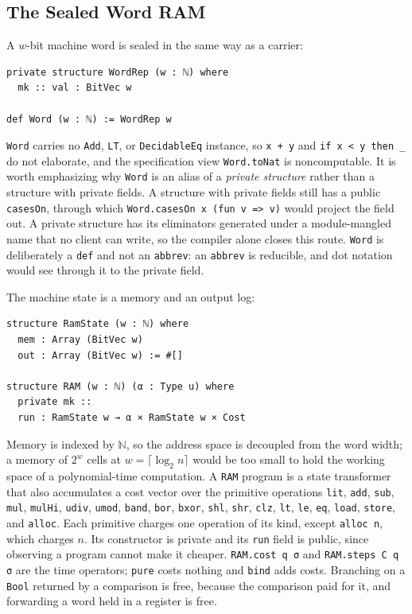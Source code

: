 \documentclass[acmsmall,nonacm]{acmart}
\begin{document}
\subsection{The Sealed Word RAM}\label{sec:ram}

A $w$-bit machine word is sealed in the same way as a carrier:

\begin{lstlisting}
private structure WordRep (w : ℕ) where
  mk :: val : BitVec w

def Word (w : ℕ) := WordRep w
\end{lstlisting}

\lstinline{Word} carries no \lstinline{Add}, \lstinline{LT}, or \lstinline{DecidableEq} instance, so \lstinline{x + y} and \lstinline{if x < y then _} do not elaborate, and the specification view \lstinline{Word.toNat} is noncomputable.
It is worth emphasizing why \lstinline{Word} is an alias of a \emph{private structure} rather than a structure with private fields.
A structure with private fields still has a public \lstinline{casesOn}, through which \lstinline{Word.casesOn x (fun v => v)} would project the field out.
A private structure has its eliminators generated under a module-mangled name that no client can write, so the compiler alone closes this route.
\lstinline{Word} is deliberately a \lstinline{def} and not an \lstinline{abbrev}: an \lstinline{abbrev} is reducible, and dot notation would see through it to the private field.

The machine state is a memory and an output log:

\begin{lstlisting}
structure RamState (w : ℕ) where
  mem : Array (BitVec w)
  out : Array (BitVec w) := #[]

structure RAM (w : ℕ) (α : Type u) where
  private mk ::
  run : RamState w → α × RamState w × Cost
\end{lstlisting}

Memory is indexed by $\mathbb{N}$, so the address space is decoupled from the word width; a memory of $2^w$ cells at $w = \lceil \log_2 n\rceil$ would be too small to hold the working space of a polynomial-time computation.
A \lstinline{RAM} program is a state transformer that also accumulates a cost vector over the primitive operations
\lstinline{lit}, \lstinline{add}, \lstinline{sub}, \lstinline{mul}, \lstinline{mulHi}, \lstinline{udiv}, \lstinline{umod}, \lstinline{band}, \lstinline{bor}, \lstinline{bxor}, \lstinline{shl}, \lstinline{shr}, \lstinline{clz}, \lstinline{lt}, \lstinline{le}, \lstinline{eq}, \lstinline{load}, \lstinline{store}, and \lstinline{alloc}.
Each primitive charges one operation of its kind, except \lstinline{alloc n}, which charges $n$.
Its constructor is private and its \lstinline{run} field is public, since observing a program cannot make it cheaper.
\lstinline{RAM.cost q σ} and \lstinline{RAM.steps C q σ} are the time operators; \lstinline{pure} costs nothing and \lstinline{bind} adds costs.
Branching on a \lstinline{Bool} returned by a comparison is free, because the comparison paid for it, and forwarding a word held in a register is free.
\end{document}
